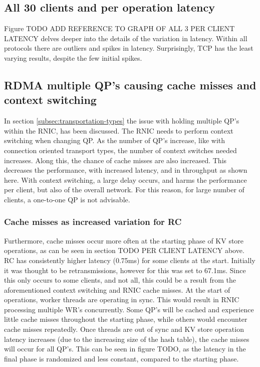 \subsection{All 30 clients and per operation latency}\label{subsec:all-30-clients-and-per-operation-latency}
Figure TODO ADD REFERENCE TO GRAPH OF ALL 3 PER CLIENT LATENCY delves deeper into the details of the variation in latency.
Within all protocols there are outliers and spikes in latency.
Surprisingly, TCP has the least varying results, despite the few initial spikes.

\subsection{RDMA multiple QP's causing cache misses and context switching}
In section \ref{subsec:transportation-types} the issue with holding multiple QP's within the RNIC, has been discussed.
The RNIC needs to perform context switching when changing QP.
As the number of QP's increase, like with connection oriented transport types, the number of context switches needed increases.
Along this, the chance of cache misses are also increased.
This decreases the performance, with increased latency, and in throughput as shown here.
With context switching, a large delay occurs, and harms the performance per client, but also of the overall network.
For this reason, for large number of clients, a one-to-one QP is not advisable.

\subsubsection{Cache misses as increased variation for RC}
Furthermore, cache misses occur more often at the starting phase of KV store operations, as can be seen in section TODO PER CLIENT LATENCY above.
RC has consistently higher latency (0.75ms) for some clients at the start.
Initially it was thought to be retransmissions, however for this was set to 67.1ms.
Since this only occurs to some clients, and not all, this could be a result from the aforementioned context switching and RNIC cache misses.
At the start of operations, worker threads are operating in sync.
This would result in RNIC processing multiple WR's concurrently.
Some QP's will be cached and experience little cache misses throughout the starting phase, while others would encounter cache misses repeatedly.
Once threads are out of sync and KV store operation latency increases (due to the increasing size of the hash table), the cache misses will occur for all QP's.
This can be seen in figure TODO, as the latency in the final phase is randomized and less constant, compared to the starting phase.

